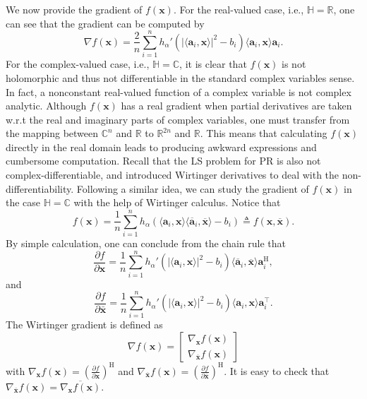 \documentclass{article}
\numberwithin{equation}{section}
\begin{document}
We now provide the gradient of $f(\mathbf{x})$. For the real-valued case, i.e., $\mathbb{H}=\mathbb{R}$, one can see that the gradient can be computed by
\begin{equation}
	\nabla f(\mathbf{x})=\frac{2}{n}\sum\limits_{i=1}^n h_{\alpha}'(|\langle \mathbf{a}_i, \mathbf{x}\rangle|^2-b_i)\langle \mathbf{a}_i, \mathbf{x}\rangle \mathbf{a}_i.\nonumber
\end{equation} 
For the complex-valued case, i.e., $\mathbb{H}=\mathbb{C}$, it is clear that $f(\mathbf{x})$ is not holomorphic and thus not differentiable in the standard complex variables sense. In fact, a nonconstant real-valued function of a complex variable is not complex analytic. 
Although $f(\mathbf{x})$ has a real gradient when partial derivatives are taken w.r.t the real and imaginary parts of complex variables, one must transfer from the mapping between $\mathbb{C}^n $ and $\mathbb{R}$ to $\mathbb{R}^{2n}$ and $\mathbb{R}$.
This means that calculating $f(\mathbf{x})$ directly in the real domain leads to  producing awkward expressions and cumbersome computation. 
Recall that the LS problem for PR is also not complex-differentiable, and \cite{candesWF} introduced Wirtinger derivatives to deal with the non-differentiability. 
Following a similar idea, we can study the gradient of $f(\mathbf{x})$ in the case $\mathbb{H}=\mathbb{C}$ with the help of Wirtinger calculus.
Notice that
$$f(\mathbf{x})=\frac{1}{n}\sum_{i=1}^nh_{\alpha}(\langle \mathbf{a}_i, \mathbf{x}\rangle \langle \overline{\mathbf{a}}_i, \overline{\mathbf{x}}\rangle-b_i)\triangleq f(\mathbf{x},\overline{\mathbf{x}}).$$
By simple calculation, one can conclude from the chain rule that
$$\frac{\partial f}{\partial \mathbf{x}}=\frac{1}{n}\sum_{i=1}^nh_{\alpha}'(|\langle \mathbf{a}_i, \mathbf{x}\rangle|^2-b_i)\langle \overline{\mathbf{a}}_i, \overline{\mathbf{x}}\rangle \mathbf{a}_i^\mathrm{H},$$
and
$$\frac{\partial f}{\partial \bar{\mathbf{x}}}=\frac{1}{n}\sum_{i=1}^nh_{\alpha}'(|\langle \mathbf{a}_i, \mathbf{x}\rangle|^2-b_i)\langle \mathbf{a}_i, \mathbf{x}\rangle \mathbf{a}_i^\top.$$
The Wirtinger gradient is defined as
\begin{equation}
\nabla{}f(\mathbf{x})=
\begin{bmatrix} \nabla_{\mathbf{x}}f(\mathbf{x}) \\
\nabla_{\overline{\mathbf{x}}}f(\mathbf{x}) \end{bmatrix}\nonumber
\end{equation}
with $\nabla_{\mathbf{x}}f(\mathbf{x})=(\frac{\partial f}{\partial \mathbf{x}})^\mathrm{H}$ and $\nabla_{\overline{\mathbf{x}}}f(\mathbf{x})=(\frac{\partial f}{\partial \overline{\mathbf{x}}})^\mathrm{H}$. It is easy to check that $\nabla_{\overline{\mathbf{x}}}f(\mathbf{x})=\overline{\nabla_{\mathbf{x}}f(\mathbf{x})}$.
\end{document}

